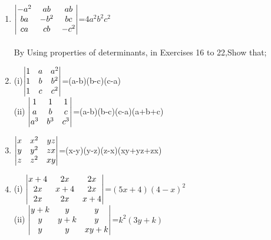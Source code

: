 \documentclass[journal,12pt,twocolumn]{IEEEtran}
\renewcommand\thesection{\arabic{section}}
\begin{document}
\begin{enumerate}[label=\thesection.\arabic*.,ref=\thesection.\theenumi]
\\
\solution 
%
\item $\begin{vmatrix}-a^2&ab&ab\\ ba&-b^2&bc\\ ca&cb&-c^2\end{vmatrix}$=$4a^2b^2c^2$\\
\\
\solution 
%
By Using properties of determinants, in Exercises 16 to 22,Show that;
\item (i)$\begin{vmatrix}1&a&a^2\\1&b&b^2\\1&c&c^2\end{vmatrix}$=(a-b)(b-c)(c-a)\\
(ii) $\begin{vmatrix}1&1&1 \\ a&b&c \\ a^3&b^3&c^3\end{vmatrix}$=(a-b)(b-c)(c-a)(a+b+c)
\\
\solution 
%
\item $\begin{vmatrix}x&x^2&yz \\ y&y^2&zx \\ z&z^2&xy\end{vmatrix}$=(x-y)(y-z)(z-x)(xy+yz+zx)
\item (i) $\begin{vmatrix}x+4&2x&2x \\ 2x&x+4&2x \\ 2x&2x&x+4\end{vmatrix}$=$(5x+4)(4-x)^2$\\
\solution 
%
(ii) $\begin{vmatrix}y+k&y&y \\ y&y+k&y \\ y&y&xy+k\end{vmatrix}$=$k^2(3y+k)$
\\
\solution 
%


\end{enumerate}
\end{document}
